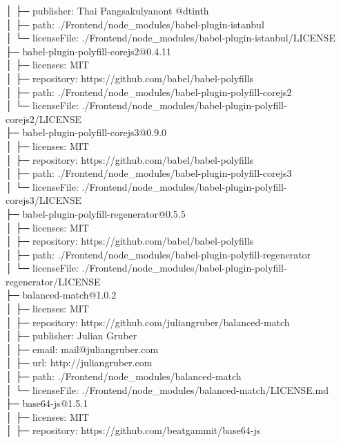 │  ├─ publisher: Thai Pangsakulyanont @dtinth\\
│  ├─ path: ./Frontend/node\_modules/babel-plugin-istanbul\\
│  └─ licenseFile: ./Frontend/node\_modules/babel-plugin-istanbul/LICENSE\\
├─ babel-plugin-polyfill-corejs2@0.4.11\\
│  ├─ licenses: MIT\\
│  ├─ repository: https://github.com/babel/babel-polyfills\\
│  ├─ path: ./Frontend/node\_modules/babel-plugin-polyfill-corejs2\\
│  └─ licenseFile: ./Frontend/node\_modules/babel-plugin-polyfill-corejs2/LICENSE\\
├─ babel-plugin-polyfill-corejs3@0.9.0\\
│  ├─ licenses: MIT\\
│  ├─ repository: https://github.com/babel/babel-polyfills\\
│  ├─ path: ./Frontend/node\_modules/babel-plugin-polyfill-corejs3\\
│  └─ licenseFile: ./Frontend/node\_modules/babel-plugin-polyfill-corejs3/LICENSE\\
├─ babel-plugin-polyfill-regenerator@0.5.5\\
│  ├─ licenses: MIT\\
│  ├─ repository: https://github.com/babel/babel-polyfills\\
│  ├─ path: ./Frontend/node\_modules/babel-plugin-polyfill-regenerator\\
│  └─ licenseFile: ./Frontend/node\_modules/babel-plugin-polyfill-regenerator/LICENSE\\
├─ balanced-match@1.0.2\\
│  ├─ licenses: MIT\\
│  ├─ repository: https://github.com/juliangruber/balanced-match\\
│  ├─ publisher: Julian Gruber\\
│  ├─ email: mail@juliangruber.com\\
│  ├─ url: http://juliangruber.com\\
│  ├─ path: ./Frontend/node\_modules/balanced-match\\
│  └─ licenseFile: ./Frontend/node\_modules/balanced-match/LICENSE.md\\
├─ base64-js@1.5.1\\
│  ├─ licenses: MIT\\
│  ├─ repository: https://github.com/beatgammit/base64-js\\
